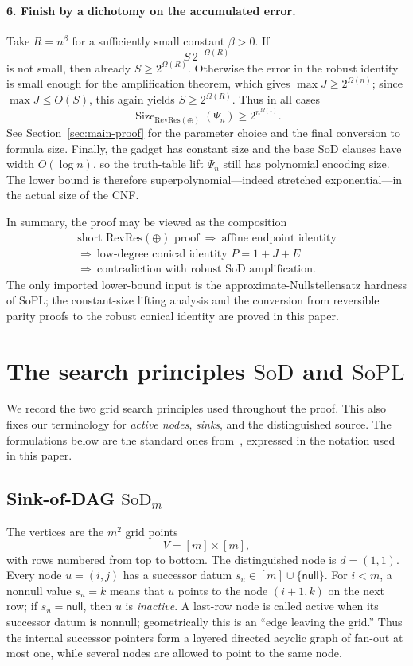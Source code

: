 \documentclass[11pt]{article}
\theoremstyle{definition}
\newcommand{\RevRes}{\mathrm{RevRes}}
\newcommand{\SoPL}{\mathrm{SoPL}}
\newcommand{\SoD}{\mathrm{SoD}}
\begin{document}
\paragraph{6. Finish by a dichotomy on the accumulated error.}
Take $R=n^\beta$ for a sufficiently small constant $\beta>0$.  If
\[
  S\,2^{-\Omega(R)}
\]
is not small, then already $S\ge2^{\Omega(R)}$.  Otherwise the error in the robust
identity is small enough for the amplification theorem, which gives
$\max J\ge2^{\Omega(n)}$; since $\max J\le O(S)$, this again yields
$S\ge2^{\Omega(R)}$.  Thus in all cases
\[
  \operatorname{Size}_{\RevRes(\oplus)}(\Psi_n)
  \ge 2^{n^{\Omega(1)}}.
\]
See Section~\ref{sec:main-proof} for the parameter choice and the final conversion to
formula size.  Finally, the gadget has constant size and the base $\SoD$ clauses have width
$O(\log n)$, so the truth-table lift $\Psi_n$ still has polynomial encoding size.
The lower bound is therefore superpolynomial---indeed stretched exponential---in the
actual size of the CNF.

In summary, the proof may be viewed as the composition
\[
\begin{array}{c}
  \text{short }\RevRes(\oplus)\text{ proof}
  \ \Longrightarrow\ 
  \text{affine endpoint identity}\\[2pt]
  \Longrightarrow\ 
  \text{low-degree conical identity }P=1+J+E\\[2pt]
  \Longrightarrow\ 
  \text{contradiction with robust }\SoD\text{ amplification}.
\end{array}
\]
The only imported lower-bound input is the approximate-Nullstellensatz hardness of
$\SoPL$; the constant-size lifting analysis and the conversion from reversible parity
proofs to the robust conical identity are proved in this paper.


\section{The search principles $\SoD$ and $\SoPL$}\label{sec:search-principles}

We record the two grid search principles used throughout the proof.  This also fixes
our terminology for \emph{active nodes}, \emph{sinks}, and the distinguished source.
The formulations below are the standard ones from~\cite{GHJMPRT}, expressed in the
notation used in this paper.

\subsection{Sink-of-DAG $\SoD_m$}\label{subsec:sod-definition}
The vertices are the $m^2$ grid points
\[
  V=[m]\times[m],
\]
with rows numbered from top to bottom.  The distinguished node is
$d=(1,1)$.  Every node $u=(i,j)$ has a successor datum
$s_u\in[m]\cup\{\mathsf{null}\}$.  For $i<m$, a nonnull value $s_u=k$
means that $u$ points to the node $(i+1,k)$ on the next row; if
$s_u=\mathsf{null}$, then $u$ is \emph{inactive}.  A last-row node is called active
when its successor datum is nonnull; geometrically this is an ``edge leaving the
grid.''  Thus the internal successor pointers form a layered directed acyclic graph
of fan-out at most one, while several nodes are allowed to point to the same node.
\end{document}
